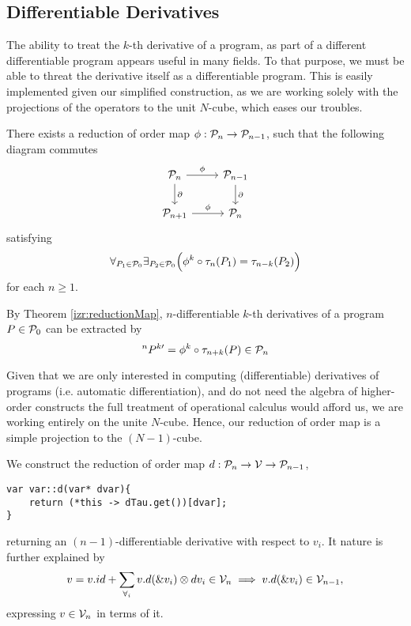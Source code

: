 \subsection{Differentiable Derivatives}\label{sec:orderReduction}
 
The ability to treat the $k$-th derivative of a program, as part of a different differentiable program appears useful in many fields. To that purpose, we must be able to threat the derivative itself as a differentiable program. This is easily implemented given our simplified construction, as we are working solely with the projections of the operators to the unit $N$-cube, which eases our troubles.

\begin{theorem}\label{izr:reductionMap}
There exists a reduction of order map $\phi:\mathcal{P}_n\to \mathcal{P}_{n-1}$, such that the
following  diagram commutes
\begin{equation}\label{eq:reductionMap}
\begin{tikzcd}
  \dP_n \arrow{r}{\phi} \arrow{d}{\D} & 
  \dP_{n-1} \arrow{d}{\D}\\
  \dP_{n+1} \arrow{r}{\phi} & 
  \dP_{n}
\end{tikzcd}
\end{equation}
satisfying
\begin{equation}
\forall_{P_1\in\mathcal{P}_0}\exists_{P_2\in\mathcal{P}_0}\Big(\phi^k\circ \tau_n(P_1)=\tau_{n-k}(P_2)\Big)
\end{equation}
for each $n\ge 1$.
\end{theorem}  
\begin{corollary}\label{cor:extraxtDerivatives}
By Theorem \ref{izr:reductionMap}, $n$-differentiable $k$-th derivatives of a program $P\in\mathcal{P}_0$ can be extracted by
\begin{equation}
^{n}P^{k\prime}=\phi^k\circ \tau_{n+k}(P)\in\mathcal{P}_n
\end{equation}
\end{corollary}

Given that we are only interested in computing (differentiable) derivatives of programs (i.e. automatic differentiation), and do not need the algebra of higher-order constructs the full treatment of operational calculus would afford us, we are working entirely on the unite $N$-cube. Hence, our reduction of order map is a simple projection to the $(N-1)$-cube.

We construct the reduction of order map $d:\mathcal{P}_n\to\mathcal{V}\to\mathcal{P}_{n-1}$,
\begin{lstlisting}
var var::d(var* dvar){
    return (*this -> dTau.get())[dvar];
}
\end{lstlisting}
returning an $(n-1)$-differentiable derivative with respect to $v_i$. It nature is further explained by
\begin{equation}
v=v.id+\sum\limits_{\forall_i}v.d(\&v_i)\otimes dv_i \in\mathcal{V}_n\implies v.d(\&v_i)\in\mathcal{V}_{n-1},
\end{equation}
expressing $v\in\mathcal{V}_n$ in terms of it.


